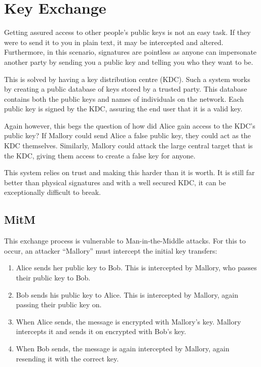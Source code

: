 	\section{Key Exchange}
		Getting assured access to other people's public keys is not an easy task.
		If they were to send it to you in plain text, it may be intercepted and altered.
		Furthermore, in this scenario, signatures are pointless as anyone can impersonate another party by sending you a public key and telling you who they want to be.

		This is solved by having a key distribution centre (KDC).
		Such a system works by creating a public database of keys stored by a trusted party.
		This database contains both the public keys and names of individuals on the network.
		Each public key is signed by the KDC, assuring the end user that it is a valid key.

		Again however, this begs the question of how did Alice gain access to the KDC's public key?
		If Mallory could send Alice a false public key, they could act as the KDC themselves.
		Similarly, Mallory could attack the large central target that is the KDC, giving them access to create a false key for anyone.

		This system relies on trust and making this harder than it is worth.
		It is still far better than physical signatures and with a well secured KDC, it can be exceptionally difficult to break.

		\subsection{MitM}
			This exchange process is vulnerable to Man-in-the-Middle attacks.
			For this to occur, an attacker ``Mallory'' must intercept the initial key transfers:
			\begin{enumerate}
				\item Alice sends her public key to Bob. This is intercepted by Mallory, who passes their public key to Bob.
				\item Bob sends his public key to Alice. This is intercepted by Mallory, again passing their public key on.
				\item When Alice sends, the message is encrypted with Mallory's key.
					Mallory intercepts it and sends it on encrypted with Bob's key.
				\item When Bob sends, the message is again intercepted by Mallory, again resending it with the correct key.
			\end{enumerate}

